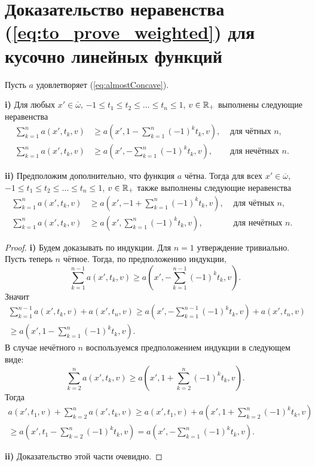 \section{Доказательство неравенства (\ref{eq:to_prove_weighted}) для кусочно ли\-ней\-ных функций}

\begin{lm}
\label{lm:weight_sum}
Пусть $a$ удовлетворяет (\ref{eq:almostConcave}).

\textbf{\textup{i)}}
Для любых $x' \in \overline{\omega}$, $-1 \le t_1 \le t_2 \le \ldots \le t_n \le 1$, $v \in \mathbb R_+$ выполнены следующие неравенства
\begin{align*}
\sum_{k = 1}^n a(x', t_k, v) & \ge a( x', 1 - \sum_{k = 1}^n (-1)^k t_k, v ), & \text{ для чётных $n$}, & \\
\sum_{k = 1}^n a(x', t_k, v) & \ge a( x', - \sum_{k = 1}^n (-1)^k t_k, v ),   & \text{ для нечётных $n$}. &
\end{align*}

\textbf{\textup{ii)}}
Предположим дополнительно, что функция $a$ чётна.
Тогда для всех $x' \in \overline{\omega}$, $-1 \le t_1 \le t_2 \le \ldots \le t_n \le 1$, $v \in \mathbb R_+$ также выполнены следующие неравенства
\begin{align*}
\sum_{k = 1}^n a(x', t_k, v) & \ge a( x', -1 + \sum_{k = 1}^n (-1)^k t_k, v ), & \text{ для чётных $n$}, & \\
\sum_{k = 1}^n a(x', t_k, v) & \ge a( x', \sum_{k = 1}^n (-1)^k t_k, v ),      & \text{ для нечётных $n$}. &
\end{align*}
\end{lm}

\begin{proof}
\textbf{\textup{i)}}
Будем доказывать по индукции.
Для $n = 1$ утверждение тривиально.
Пусть теперь $n$ чётное.
Тогда, по предположению индукции,
$$
\sum_{k=1}^{n - 1} a(x', t_k, v) \ge a( x', -\sum_{k = 1}^{n - 1} (-1)^k t_k, v ).
$$
Значит
\begin{multline*}
\sum_{k = 1}^{n - 1} a( x', t_k, v ) + a( x', t_n, v )
\ge a( x', -\sum_{k = 1}^{n - 1} (-1)^k t_k, v ) + a( x', t_n, v )
\\ \ge a( x', 1 - \sum_{k = 1}^{n} (-1)^k t_k, v ).
\end{multline*}
В случае нечётного $n$ воспользуемся предположением индукции в следующем виде:
$$
\sum_{k=2}^n a(x', t_k, v) \ge a( x', 1 + \sum_{k = 2}^n (-1)^k t_k, v ).
$$
Тогда
\begin{multline*}
a( x', t_1, v ) + \sum_{k = 2}^n a( x', t_k, v )
\ge a( x', t_1, v ) + a( x', 1 + \sum_{k = 2}^{n} (-1)^k t_k, v )
\\ \ge a( x', t_1 - \sum_{k = 2}^{n} (-1)^k t_k, v ) = a( x', -\sum_{k = 1}^{n} (-1)^k t_k, v ).
\end{multline*}

\textbf{\textup{ii)}} Доказательство этой части очевидно.
\end{proof}

